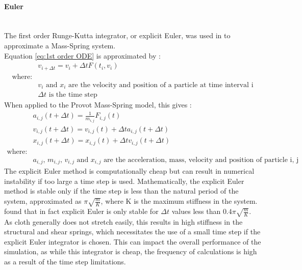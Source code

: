 \paragraph{Euler}\leavevmode\\
The first order Runge-Kutta integrator, or explicit Euler, was used in \textcite{Provot2001} to approximate a Mass-Spring system.
\\Equation \ref{eq:1st order ODE} is approximated by \parencite[3]{Wang2009a}:
\begin{equation}
\begin{split}
\label{eq:explicit euler formal}
  &v_{i + \Delta t} = v_{i} + \Delta t F(t_{i}, v_{i})
  \\\text{where:}
  \\&\text{$v_{i}$ and $x_{i}$ are the velocity and position of a particle at time interval i}
  \\&\text{$\Delta t$ is the time step}
\end{split}
\end{equation}
When applied to the Provot Mass-Spring model, this gives \parencite[3]{Provot2001}:
\begin{equation}
\begin{split}
\label{eq:explicit euler provot}
  &a_{i, j}(t + \Delta t) = \frac{1}{m_{i, j}}F_{i, j}(t)
  \\&v_{i, j}(t + \Delta t) = v_{i, j}(t) + \Delta ta_{i, j}(t + \Delta t)
  \\&x_{i, j}(t + \Delta t) = x_{i, j}(t) + \Delta tv_{i, j}(t + \Delta t)
  \\\text{where:}
  \\&\text{$a_{i, j}$, $m_{i, j}$, $v_{i, j}$ and $x_{i, j}$ are the acceleration, mass, velocity and position of particle i, j respectively}
\end{split}
\end{equation}
The explicit Euler method is computationally cheap but can result in numerical instability if too large a time step is used. Mathematically, the explicit Euler method is stable only if the time step is less than the natural period of the system, approximated as $\pi\sqrt{\frac{m}{K}}$, where K is the maximum stiffness in the system. \textcite[2]{Vassilev2001} found that in fact explicit Euler is only stable for $\Delta t$ values less than $0.4\pi\sqrt{\frac{m}{K}}$. 
\\As cloth generally does not stretch easily, this results in high stiffness in the structural and shear springs, which necessitates the use of a small time step if the explicit Euler integrator is chosen. This can impact the overall performance of the simulation, as while this integrator is cheap, the frequency of calculations is high as a result of the time step limitations.

